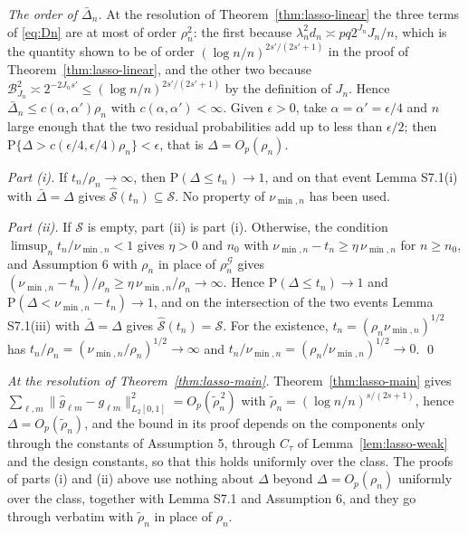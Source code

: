 \documentclass[10pt]{book}
\theoremstyle{definition}
\newcommand{\Prob}{\mathrm{P}}
\newcommand{\cv}{\ell}
\newcommand{\md}{m}
\newcommand{\gcomp}[2]{g_{#1#2}}
\newcommand{\penn}{\lambda_{n}}
\newcommand{\seff}{s'}
\newcommand{\rhoG}{\rho^{\mathcal{G}}_{n}}
\begin{document}
{\emph{The order of $\bar{\Delta}_n$.} At the resolution of Theorem~\ref{thm:lasso-linear} the three terms of
\eqref{eq:Dn} are at most of order $\rho_n^2$: the first because
$\penn^2d_n \asymp pq2^{J_n}J_n/n$, which is the quantity shown to be of order
$(\log n/n)^{2\seff/(2\seff+1)}$ in the proof of Theorem~\ref{thm:lasso-linear}, and the other two
because $\mathcal{B}^2_{J_n} \asymp 2^{-2J_n\seff} \le
(\log n/n)^{2\seff/(2\seff+1)}$ by the definition of $J_n$. Hence
$\bar{\Delta}_n \le c(\alpha,\alpha')\rho_n$ with $c(\alpha,\alpha') < \infty$. Given $\epsilon > 0$,
take $\alpha = \alpha' = \epsilon/4$ and $n$ large enough that the two
residual probabilities add up to less than $\epsilon/2$; then
$\Prob\{\Delta > c(\epsilon/4,\epsilon/4)\rho_n\} < \epsilon$, that is
$\Delta = O_p(\rho_n)$.

\emph{Part (i).} If $t_n/\rho_n \to \infty$, then
$\Prob(\Delta \le t_n) \to 1$, and on that event Lemma S7.1(i) with
$\bar{\Delta} = \Delta$ gives $\widehat{\mathcal{S}}(t_n) \subseteq \mathcal{S}$. No property of $\nu_{\min,n}$
has been used.

\emph{Part (ii).} If $\mathcal{S}$ is empty, part (ii) is part (i). Otherwise, the
condition $\limsup_n t_n/\nu_{\min,n} < 1$ gives $\eta > 0$ and $n_0$ with
$\nu_{\min,n} - t_n \ge \eta\,\nu_{\min,n}$ for $n \ge n_0$, and Assumption 6 with $\rho_n$ in place of $\rhoG$ gives
$(\nu_{\min,n} - t_n)/\rho_n \ge \eta\,\nu_{\min,n}/\rho_n \to \infty$. Hence
$\Prob(\Delta \le t_n) \to 1$ and $\Prob(\Delta < \nu_{\min,n} - t_n) \to 1$, and
on the intersection of the two events Lemma S7.1(iii) with $\bar{\Delta} = \Delta$ gives
$\widehat{\mathcal{S}}(t_n) = \mathcal{S}$. For the existence, $t_n = (\rho_n\nu_{\min,n})^{1/2}$ has
$t_n/\rho_n = (\nu_{\min,n}/\rho_n)^{1/2} \to \infty$ and
$t_n/\nu_{\min,n} = (\rho_n/\nu_{\min,n})^{1/2} \to 0$. \qed

\textcolor{colR1}{\emph{At the resolution of Theorem~\ref{thm:lasso-main}.} Theorem~\ref{thm:lasso-main} gives
$\sum_{\cv,\md}\lVert\widehat{g}_{\cv\md}-\gcomp{\cv}{\md}\rVert^2_{L_2[0,1]}
= O_p(\tilde\rho_n^{\,2})$ with $\tilde\rho_n = (\log n/n)^{s/(2s+1)}$, hence
$\Delta = O_p(\tilde\rho_n)$, and the bound in its proof depends on the
components only through the constants of Assumption 5, through $C_\tau$ of
Lemma~\ref{lem:lasso-weak} and the design constants, so that this holds uniformly over the
class. The proofs of parts (i) and (ii) above use nothing about $\Delta$
beyond $\Delta = O_p(\rho_n)$ uniformly over the class, together with
Lemma S7.1 and Assumption 6, and they go through verbatim with
$\tilde\rho_n$ in place of $\rho_n$.}
}
\end{document}
